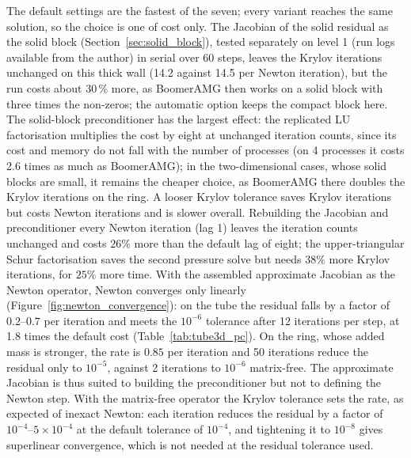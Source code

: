 The default settings are the fastest of the seven; every variant reaches the same solution, so the choice is one of cost only.
The Jacobian of the solid residual as the solid block (Section~\ref{sec:solid_block}), tested separately on level 1 (run logs available from the author) in serial over 60 steps, leaves the Krylov iterations unchanged on this thick wall (14.2 against 14.5 per Newton iteration), but the run costs about 30\,\% more, as BoomerAMG then works on a solid block with three times the non-zeros; the automatic option keeps the compact block here.
The solid-block preconditioner has the largest effect: the replicated LU factorisation multiplies the cost by eight at unchanged iteration counts, since its cost and memory do not fall with the number of processes (on 4 processes it costs 2.6 times as much as BoomerAMG); in the two-dimensional cases, whose solid blocks are small, it remains the cheaper choice, as BoomerAMG there doubles the Krylov iterations on the ring.
A looser Krylov tolerance saves Krylov iterations but costs Newton iterations and is slower overall.
Rebuilding the Jacobian and preconditioner every Newton iteration (lag 1) leaves the iteration counts unchanged and costs $26\%$ more than the default lag of eight; the upper-triangular Schur factorisation saves the second pressure solve but needs $38\%$ more Krylov iterations, for $25\%$ more time.
With the assembled approximate Jacobian as the Newton operator, Newton converges only linearly (Figure~\ref{fig:newton_convergence}): on the tube the residual falls by a factor of $0.2$--$0.7$ per iteration and meets the $10^{-6}$ tolerance after 12 iterations per step, at 1.8 times the default cost (Table~\ref{tab:tube3d_pc}).
On the ring, whose added mass is stronger, the rate is $0.85$ per iteration and 50 iterations reduce the residual only to $10^{-5}$, against 2 iterations to $10^{-6}$ matrix-free.
The approximate Jacobian is thus suited to building the preconditioner but not to defining the Newton step.
With the matrix-free operator the Krylov tolerance sets the rate, as expected of inexact Newton: each iteration reduces the residual by a factor of $10^{-4}$--$5\times10^{-4}$ at the default tolerance of $10^{-4}$, and tightening it to $10^{-8}$ gives superlinear convergence, which is not needed at the residual tolerance used.

